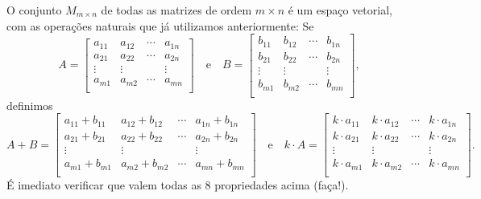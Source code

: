 \begin{ex}
	O conjunto $M_{m\times n}$ de todas as matrizes de ordem $m\times n$ é um espaço vetorial, com as operações naturais que já utilizamos anteriormente: Se
	\begin{equation}
	A =
	\left[
	\begin{array}{cccc}
	a_{11} & a_{12} & \cdots & a_{1n} \\
	a_{21} & a_{22} & \cdots & a_{2n} \\
	\vdots & \vdots &        & \vdots \\
	a_{m1} & a_{m2} & \cdots & a_{mn} \\
	\end{array}
	\right] \quad \text{e} \quad
	B =
	\left[
	\begin{array}{cccc}
	b_{11} & b_{12} & \cdots & b_{1n} \\
	b_{21} & b_{22} & \cdots & b_{2n} \\
	\vdots & \vdots &        & \vdots \\
	b_{m1} & b_{m2} & \cdots & b_{mn} \\
	\end{array}
	\right],
	\end{equation} definimos
	\begin{equation}
	A + B =
	\left[
	\begin{array}{cccc}
	a_{11} + b_{11} & a_{12} + b_{12} & \cdots & a_{1n} + b_{1n} \\
	a_{21} + b_{21} & a_{22} + b_{22} & \cdots & a_{2n} + b_{2n} \\
	\vdots & \vdots &        & \vdots \\
	a_{m1} + b_{m1} & a_{m2} + b_{m2} & \cdots & a_{mn} + b_{mn} \\
	\end{array}
	\right] \quad \text{e} \quad
	k\cdot A =
	\left[
	\begin{array}{cccc}
	k\cdot a_{11} & k\cdot a_{12} & \cdots & k\cdot a_{1n} \\
	k\cdot a_{21} & k\cdot a_{22} & \cdots & k\cdot a_{2n} \\
	\vdots & \vdots &        & \vdots \\
	k\cdot a_{m1} & k\cdot a_{m2} & \cdots & k\cdot a_{mn} \\
	\end{array}
	\right].
	\end{equation} É imediato verificar que valem todas as 8 propriedades acima (faça!).
\end{ex}


